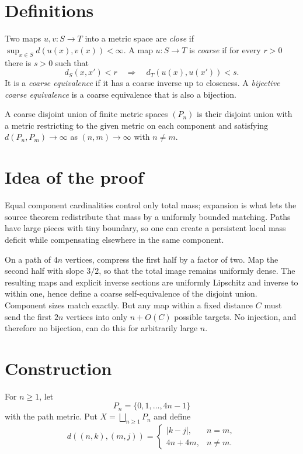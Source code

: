 \documentclass[11pt]{article}
\begin{document}
\section{Definitions}

Two maps $u,v:S\to T$ into a metric space are \emph{close} if
$\sup_{x\in S}d(u(x),v(x))<\infty$.  A map $u:S\to T$ is \emph{coarse} if
for every $r>0$ there is $s>0$ such that
\[
 d_S(x,x')<r \quad\Longrightarrow\quad d_T(u(x),u(x'))<s.
\]
It is a \emph{coarse equivalence} if it has a coarse inverse up to closeness.
A \emph{bijective coarse equivalence} is a coarse equivalence that is also a
bijection.

A coarse disjoint union of finite metric spaces $(P_n)$ is their disjoint
union with a metric restricting to the given metric on each component and
satisfying $d(P_n,P_m)\to\infty$ as $(n,m)\to\infty$ with $n\ne m$.

\section{Idea of the proof}

Equal component cardinalities control only total mass; expansion is what lets
the source theorem redistribute that mass by a uniformly bounded matching.
Paths have large pieces with tiny boundary, so one can create a persistent
local mass deficit while compensating elsewhere in the same component.

On a path of $4n$ vertices, compress the first half by a factor of two.  Map
the second half with slope $3/2$, so that the total image remains uniformly
dense.  The resulting maps and explicit inverse sections are uniformly
Lipschitz and inverse to within one, hence define a coarse self-equivalence of
the disjoint union.  Component sizes match exactly.  But any map within a
fixed distance $C$ must send the first $2n$ vertices into only
$n+O(C)$ possible targets.  No injection, and therefore no bijection, can do
this for arbitrarily large $n$.

\section{Construction}

For $n\geq1$, let
\[
 P_n=\{0,1,\ldots,4n-1\}
\]
with the path metric.  Put $X=\bigsqcup_{n\geq1}P_n$ and define
\[
 d((n,k),(m,j))=
 \begin{cases}
 |k-j|,&n=m,\\
 4n+4m,&n\ne m.
 \end{cases}                                                   \tag{1}
\]
\end{document}
